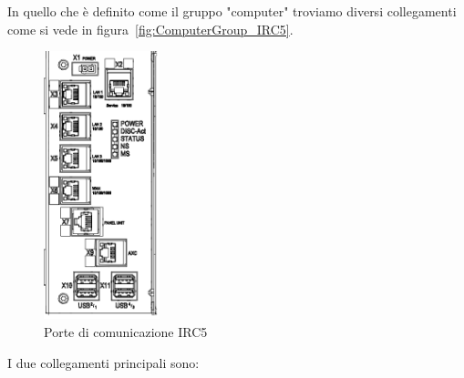 In quello che è definito come il gruppo "computer" troviamo diversi collegamenti come si vede in figura~\vref{fig:ComputerGroup_IRC5}.
\begin{figure}
	\centering
	\includegraphics[width=0.30\textwidth]{Immagini/ConnettoriSulComputer}
	\caption{Porte di comunicazione IRC5}
	\label{fig:ComputerGroup_IRC5}
\end{figure}
I due collegamenti principali sono:
